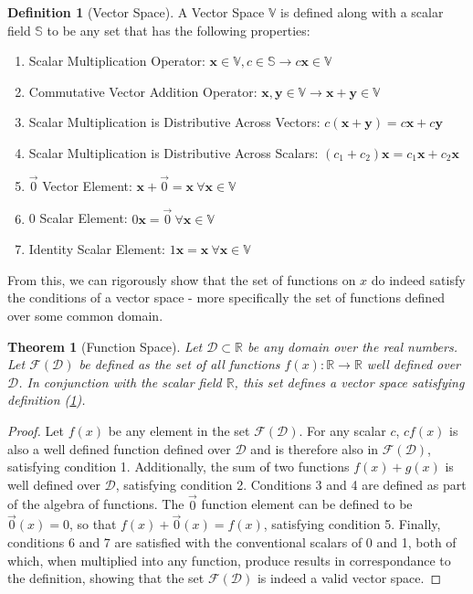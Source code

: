 \documentclass{article}
\newcommand{\B}[1]{\boldsymbol{#1}}
\newcommand*\R{\mathbb{R}}
\newtheorem{theorem}{Theorem}[section]
\theoremstyle{definition}
\newtheorem{definition}{Definition}[section]
\theoremstyle{remark}
\begin{document}
\newpage
\begin{definition}[Vector Space]
  A Vector Space $\mathbb{V}$ is defined along with a scalar field $\mathbb{S}$
  to be any set that has the following properties:

  \begin{enumerate}
    \item Scalar Multiplication Operator: $\B{x} \in \mathbb{V}, c \in \mathbb{S} \rightarrow c \B{x} \in \mathbb{V}$
    \item Commutative Vector Addition Operator: $\B{x}, \B{y} \in \mathbb{V} \rightarrow \B{x} + \B{y} \in \mathbb{V}$
    \item Scalar Multiplication is Distributive Across Vectors: $c (\B{x} + \B{y}) = c \B{x} + c \B{y}$
    \item Scalar Multiplication is Distributive Across Scalars: $ (c_1 + c_2) \B{x} = c_1 \B{x} + c_2 \B{x}$
    \item $\vec{0}$ Vector Element: $\B{x} + \vec{0} = \B{x} ~ \forall \B{x} \in \mathbb{V}$
    \item 0 Scalar Element: $0 \B{x} = \vec{0} ~ \forall \B{x} \in \mathbb{V}$
    \item Identity Scalar Element: $1 \B{x} = \B{x} ~ \forall \B{x} \in \mathbb{V}$ 
  \end{enumerate}
  \label{def:vectorSpace}
\end{definition}

From this, we can rigorously show that the set of functions
on $x$ do indeed satisfy the conditions of a vector space - more 
specifically the set of functions defined over some common domain.

\begin{theorem}[Function Space]
  Let $\mathcal{D} \subset \R$ be any domain over the real numbers. 
  Let $\mathscr{F}(\mathcal{D})$ be defined as the set of all functions $f(x) : \mathbb{R} \to \mathbb{R}$ well defined over $\mathcal{D}$. 
  In conjunction with the scalar field $\R$, this set defines a vector space satisfying definition (\ref{def:vectorSpace}).
\end{theorem}

\begin{proof}
  Let $f(x)$ be any element in the set $\mathscr{F}(\mathcal{D})$. For any scalar $c$, $cf(x)$ is also a well defined function 
  defined over $\mathcal{D}$ and is therefore also in $\mathscr{F}(\mathcal{D})$, satisfying condition 1. Additionally,
  the sum of two functions $f(x) + g(x)$ is well defined over $\mathcal{D}$, satisfying condition 2. 
  Conditions 3 and 4  are defined as part of the algebra of functions.
  The $\vec{0}$ function element can be defined to be $\vec{0}(x) = 0$,
  so that $f(x) + \vec{0}(x) = f(x)$, satisfying condition 5. Finally,
  conditions 6 and 7 are satisfied with the conventional scalars of 0 and 1,
  both of which, when multiplied into any function, produce results in correspondance
  to the definition, showing that the set $\mathscr{F}(\mathcal{D})$ is indeed a valid vector space.

\end{proof}
\end{document}
